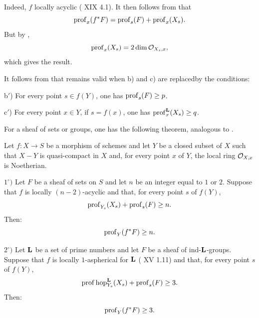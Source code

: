 Indeed, $f$  locally acyclic ( XIX 4.1). It then follows from  that
$$
\operatorname{prof}_x(f^*F)=\operatorname{prof}_s(F)+\operatorname{prof}_x(X_s).
$$
But by ,
$$
\operatorname{prof}_x(X_s)=2\dim\mathcal O_{X_s,x},
$$
which gives the result.

\begin{remarque} \label{XIV.1.17}
It follows from  that  remains valid when b) and c) are replaced\pageoriginale by the conditions:

b$'$) For every point $s\in f(Y)$, one has $\operatorname{prof}_s(F)\geq p$.

c$'$) For every point $x\in Y$, if $s=f(x)$, one has $\operatorname{prof}^\mathbf L_x(X_s)\geq q$.
\end{remarque}

For a sheaf of sets or groups, one has the following theorem, analogous to .

\begin{theoreme} \label{XIV.1.18}
Let $f:X\to S$ be a morphism of schemes and let $Y$ be a closed subset of $X$ such that $X-Y$ is quasi-compact in $X$ and, for every point $x$ of $Y$, the local ring $\mathcal O_{X,x}$ is Noetherian.

$1^\circ)$ Let $F$ be a sheaf of sets on $S$ and let $n$ be an integer equal to $1$ or $2$. Suppose that $f$ is locally $(n-2)$-acyclic and that, for every point $s$ of $f(Y)$,
$$
\operatorname{prof}_{Y_s}(X_s)+\operatorname{prof}_s(F)\geq n.
$$
Then:$$
\operatorname{prof}_Y(f^*F)\geq n.
$$

$2^\circ)$ Let $\mathbf L$ be a set of prime numbers and let $F$ be a sheaf of ind-$\mathbf L$-groups. Suppose that $f$ is locally $1$-aspherical for $\mathbf L$ (\textup{ XV 1.11}) and that, for every point $s$ of $f(Y)$,
$$
\operatorname{prof}\operatorname{hop}^\mathbf L_{Y_s}(X_s)+\operatorname{prof}_s(F)\geq 3.
$$
Then:$$
\operatorname{prof}_Y(f^*F)\geq 3.
$$
\end{theoreme}

